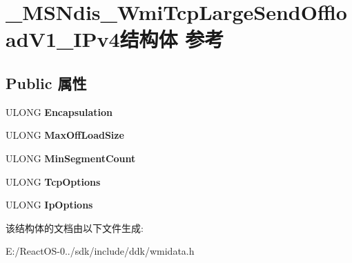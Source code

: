 \hypertarget{struct___m_s_ndis___wmi_tcp_large_send_offload_v1___i_pv4}{}\section{\+\_\+\+M\+S\+Ndis\+\_\+\+Wmi\+Tcp\+Large\+Send\+Offload\+V1\+\_\+\+I\+Pv4结构体 参考}
\label{struct___m_s_ndis___wmi_tcp_large_send_offload_v1___i_pv4}
\subsection*{Public 属性}
\begin{DoxyCompactItemize}
\item 
\mbox{\label{struct___m_s_ndis___wmi_tcp_large_send_offload_v1___i_pv4_afc47aa007a5567bac74e71588d408acc}} 
U\+L\+O\+NG {\bfseries Encapsulation}
\item 
\mbox{\label{struct___m_s_ndis___wmi_tcp_large_send_offload_v1___i_pv4_aadcee19441c676e714d29bfd8c61097c}} 
U\+L\+O\+NG {\bfseries Max\+Off\+Load\+Size}
\item 
\mbox{\label{struct___m_s_ndis___wmi_tcp_large_send_offload_v1___i_pv4_a80cd92b1a36c46150c4fb04478945d4f}} 
U\+L\+O\+NG {\bfseries Min\+Segment\+Count}
\item 
\mbox{\label{struct___m_s_ndis___wmi_tcp_large_send_offload_v1___i_pv4_aa5124195c6f54f606e869538ec03cfff}} 
U\+L\+O\+NG {\bfseries Tcp\+Options}
\item 
\mbox{\label{struct___m_s_ndis___wmi_tcp_large_send_offload_v1___i_pv4_ae6f0e3326f2c12cc07e7446bc8c8c0cf}} 
U\+L\+O\+NG {\bfseries Ip\+Options}
\end{DoxyCompactItemize}


该结构体的文档由以下文件生成\+:\begin{DoxyCompactItemize}
\item 
E\+:/\+React\+O\+S-\/0../sdk/include/ddk/wmidata.\+h\end{DoxyCompactItemize}
